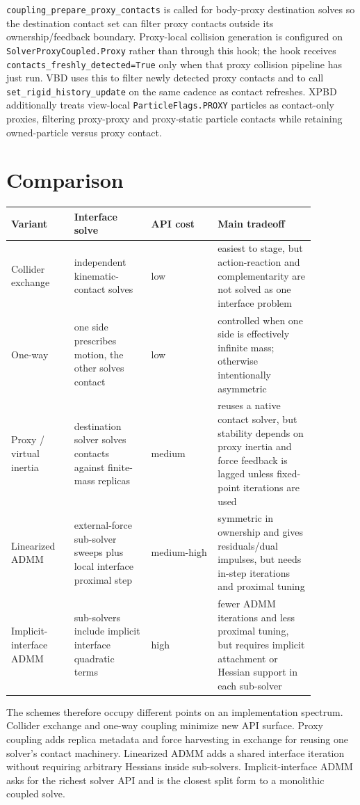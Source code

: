 \documentclass[11pt]{article}
\begin{document}
\texttt{coupling\_prepare\_proxy\_contacts} is called for body-proxy destination
solves so the destination contact set can filter proxy contacts outside its
ownership/feedback boundary. Proxy-local collision generation is configured on
\texttt{SolverProxyCoupled.Proxy} rather than through this hook; the hook receives
\texttt{contacts\_freshly\_detected=True} only when that proxy collision pipeline
has just run. VBD uses this to filter newly detected proxy contacts and to call
\texttt{set\_rigid\_history\_update} on the same cadence as contact refreshes.
XPBD additionally treats view-local \texttt{ParticleFlags.PROXY} particles as
contact-only proxies, filtering proxy-proxy and proxy-static particle contacts
while retaining owned-particle versus proxy contact.

\section{Comparison}

\begin{center}
\small
\begin{tabular}{@{}L{0.18\linewidth}L{0.22\linewidth}L{0.19\linewidth}L{0.28\linewidth}@{}}
\toprule
Variant & Interface solve & API cost & Main tradeoff \\
\midrule
Collider exchange
& independent kinematic-contact solves
& low
& easiest to stage, but action-reaction and complementarity are not solved as one
interface problem \\
\addlinespace
One-way
& one side prescribes motion, the other solves contact
& low
& controlled when one side is effectively infinite mass; otherwise intentionally
asymmetric \\
\addlinespace
Proxy / virtual inertia
& destination solver solves contacts against finite-mass replicas
& medium
& reuses a native contact solver, but stability depends on proxy inertia and force
feedback is lagged unless fixed-point iterations are used \\
\addlinespace
Linearized ADMM
& external-force sub-solver sweeps plus local interface proximal step
& medium-high
& symmetric in ownership and gives residuals/dual impulses, but needs in-step
iterations and proximal tuning \\
\addlinespace
Implicit-interface ADMM
& sub-solvers include implicit interface quadratic terms
& high
& fewer ADMM iterations and less proximal tuning, but requires implicit attachment or
Hessian support in each sub-solver \\
\bottomrule
\end{tabular}
\end{center}

The schemes therefore occupy different points on an implementation spectrum. Collider
exchange and one-way coupling minimize new API surface. Proxy coupling adds replica
metadata and force harvesting in exchange for reusing one solver's contact machinery.
Linearized ADMM adds a shared interface iteration without requiring arbitrary Hessians
inside sub-solvers. Implicit-interface ADMM asks for the richest solver API and is the
closest split form to a monolithic coupled solve.
\end{document}
